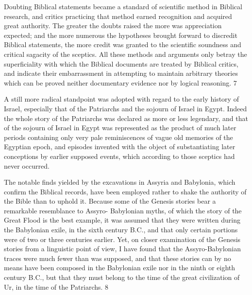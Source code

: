 Doubting Biblical statements became a standard of scientific method in Biblical research,
and critics practicing that method earned recognition and acquired great authority. The
greater the doubts raised the more was appreciation expected; and the more numerous the
hypotheses brought forward to discredit Biblical statements, the more credit was granted to
the scientific soundness and critical sagacity of the sceptics. All these methods and
arguments only betray the superficiality with which the Biblical documents are treated by
Biblical critics, and indicate their embarrassment in attempting to maintain arbitrary theories
which can be proved neither documentary evidence nor by logical reasoning. 7

A still more radical standpoint was adopted with regard to the early history of Israel,
especially that of the Patriarchs and the sojourn of Israel in Egypt. Indeed the whole story of
the Patriarchs was declared as more or less legendary, and that of the sojourn of Israel in
Egypt was represented as the product of much later periods containing only very pale
reminiscences of vague old memories of the Egyptian epoch, and episodes invented with the
object of substantiating later conceptions by earlier supposed events, which according to
those sceptics had never occurred.

The notable finds yielded by the excavations in Assyria and Babylonia, which confirm the
Biblical records, have been employed rather to shake the authority of the Bible than to
uphold it. Because some of the Genesis stories bear a remarkable resemblance to Assyro-
Babylonian myths, of which the story of the Great Flood is the best example, it was assumed
that they were written during the Babylonian exile, in the sixth century B.C., and that only
certain portions were of two or three centuries earlier. Yet, on closer examination of the
Genesis stories from a linguistic point of view, I have found that the Assyro-Babylonian
traces were much fewer than was supposed, and that these stories can by no means have been
composed in the Babylonian exile nor in the ninth or eighth century B.C., but that they must
belong to the time of the great civilization of Ur, in the time of the Patriarchs. 8

